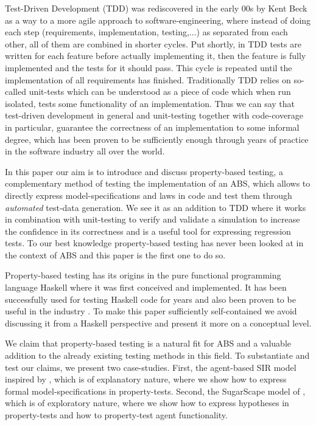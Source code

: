 Test-Driven Development (TDD) was rediscovered in the early 00s by Kent Beck \cite{beck_test_2002} as a way to a more agile approach to software-engineering, where instead of doing each step (requirements, implementation, testing,...) as separated from each other, all of them are combined in shorter cycles. Put shortly, in TDD tests are written for each feature before actually implementing it, then the feature is fully implemented and the tests for it should pass. This cycle is repeated until the implementation of all requirements has finished. Traditionally TDD relies on so-called unit-tests which can be understood as a piece of code which when run isolated, tests some functionality of an implementation. Thus we can say that test-driven development in general and unit-testing together with code-coverage in particular, guarantee the correctness of an implementation to some informal degree, which has been proven to be sufficiently enough through years of practice in the software industry all over the world. 

In this paper our aim is to introduce and discuss property-based testing, a complementary method of testing the implementation of an ABS, which allows to directly express model-specifications and laws in code and test them through \textit{automated} test-data generation. We see it as an addition to TDD where it works in combination with unit-testing to verify and validate a simulation to increase the confidence in its correctness and is a useful tool for expressing regression tests. To our best knowledge property-based testing has never been looked at in the context of ABS and this paper is the first one to do so.

Property-based testing has its origins \cite{claessen_quickcheck_2000,claessen_testing_2002,runciman_smallcheck_2008} in the pure functional programming language Haskell  where it was first conceived and implemented. It has been successfully used for testing Haskell code for years and also been proven to be useful in the industry \cite{hughes_quickcheck_2007}. To make this paper sufficiently self-contained we avoid discussing it from a Haskell perspective and present it more on a conceptual level. 

We claim that property-based testing is a natural fit for ABS and a valuable addition to the already existing testing methods in this field. To substantiate and test our claims, we present two case-studies. First, the agent-based SIR model inspired by , which is of explanatory nature, where we show how to express formal model-specifications in property-tests. Second, the SugarScape model of , which is of exploratory nature, where we show how to express hypotheses in property-tests and how to property-test agent functionality.

